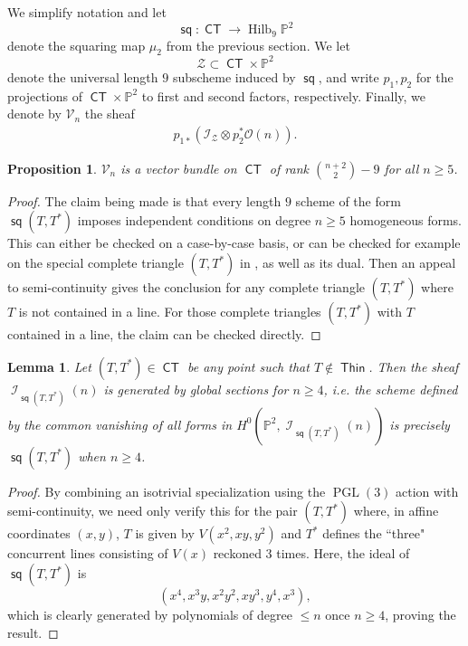 \documentclass[reqno, 11pt]{amsart}
\theoremstyle{plain}
\newtheorem{proposition}[theorem]{Proposition}
\newtheorem{lemma}[theorem]{Lemma}
\theoremstyle{remark}
\renewcommand{\P}{\mathbb{P}}
\DeclareMathOperator{\PGL}{PGL}
\DeclareMathOperator{\Hilb}{Hilb}
\DeclareMathOperator{\I}{\mathcal{I}}
\renewcommand{\O}{\mathcal{O}}
\DeclareMathOperator{\CT}{\mathsf{CT}}
\DeclareMathOperator{\Thin}{\mathsf{Thin}}
\DeclareMathOperator{\s}{\mathsf{sq}}
\begin{document}
We simplify notation and let
\[\s : \CT \to \Hilb_{9}\P^{2} \] denote the squaring map
$\mu_{2}$ from the previous section.  We let
\[\mathcal{Z} \subset \CT \times \P^{2}\] denote the universal length
$9$ subscheme induced by $\s$, and write $p_1, p_2$ for the projections of
$\CT \times \P^{2}$ to first and second factors, respectively.  Finally, we denote by $\mathcal{V}_{n}$ the sheaf 
\begin{align}
\label{Vn}
p_{1*}\left(\mathcal{I}_{\mathcal{Z}} \otimes p_{2}^{*}\O(n) \right).
\end{align}
\begin{proposition}
  \label{proposition:vectorbundle}
  $\mathcal{V}_{n}$  is
  a vector bundle on $\CT$ of rank ${n+2 \choose 2} - 9$ for all $n \geq 5$.
\end{proposition}

\begin{proof}
  The claim being made is that every length $9$ scheme of the form  $\s(T,T^{*})$
  imposes independent conditions on degree $n \geq 5$ homogeneous
  forms. This can either be
  checked on a case-by-case basis, or can be checked for example on
  the special complete triangle $(T,T^{*})$ in
  , as well as its dual. Then an appeal to semi-continuity gives
  the conclusion for any complete triangle $(T,T^{*})$ where $T$ is
  not contained in a line.  For those complete triangles $(T,T^{*})$
  with $T$ contained in a line, the claim can be checked directly.
\end{proof}

\begin{lemma}
    \label{lemma:generatedquintics} Let  $(T,T^{*}) \in \CT$ be any point such that $T \notin \Thin$. Then the sheaf $\I_{\s(T,T^{*})}(n)$ is generated by global sections for $n \geq 4$, i.e. the scheme defined by the common vanishing of all forms in $H^{0}(\P^{2},\I_{\s(T,T^{*})}(n))$ is precisely $\s(T,T^{*})$ when $n \geq 4$.
\end{lemma}

\begin{proof}
    By combining an isotrivial specialization using the $\PGL(3)$ action with semi-continuity, we need only verify this for the pair $(T,T^{*})$ where, in affine coordinates $(x,y)$, $T$ is given by $V(x^2,xy,y^2)$ and $T^{*}$ defines the ``three" concurrent lines consisting of $V(x)$  reckoned 3 times.  Here, the ideal of $\s(T,T^{*})$ is \[(x^{4},x^{3}y,x^{2}y^{2},xy^{3},y^{4},x^3),\] which is clearly generated by polynomials of degree $\leq n$ once $n \geq 4$, proving the result.
\end{proof} 
\end{document}
